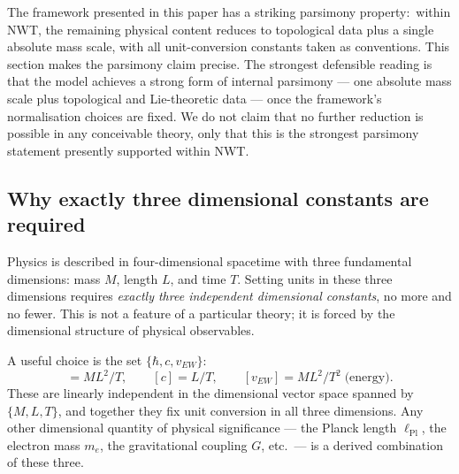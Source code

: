 \documentclass[11pt]{article}
\begin{document}
The framework presented in this paper has a striking parsimony
property:\ within NWT, the remaining physical content reduces to
topological data plus a single absolute mass scale, with all
unit-conversion constants taken as conventions.  This section makes
the parsimony claim precise.  The strongest defensible reading is
that the model achieves a strong form of internal parsimony --- one
absolute mass scale plus topological and Lie-theoretic data ---
once the framework's normalisation choices are fixed.  We do not
claim that no further reduction is possible in any conceivable
theory, only that this is the strongest parsimony statement
presently supported within NWT.

\subsection{Why exactly three dimensional constants are required}
\label{sec:three-dim-constants}

Physics is described in four-dimensional spacetime with three
fundamental dimensions: mass $M$, length $L$, and time $T$.  Setting
units in these three dimensions requires \emph{exactly three
independent dimensional constants}, no more and no fewer.  This is
not a feature of a particular theory; it is forced by the dimensional
structure of physical observables.

A useful choice is the set $\{\hbar, c, v_{EW}\}$:
\begin{equation}
  [\hbar] = M L^2 / T,
  \qquad
  [c] = L/T,
  \qquad
  [v_{EW}] = M L^2 / T^2 \;\text{(energy)}.
\end{equation}
These are linearly independent in the dimensional vector space
spanned by $\{M, L, T\}$, and together they fix unit conversion in
all three dimensions.  Any other dimensional quantity of physical
significance --- the Planck length $\ell_{\mathrm{Pl}}$, the electron
mass $m_e$, the gravitational coupling $G$, etc.\ --- is a derived
combination of these three.
\end{document}
